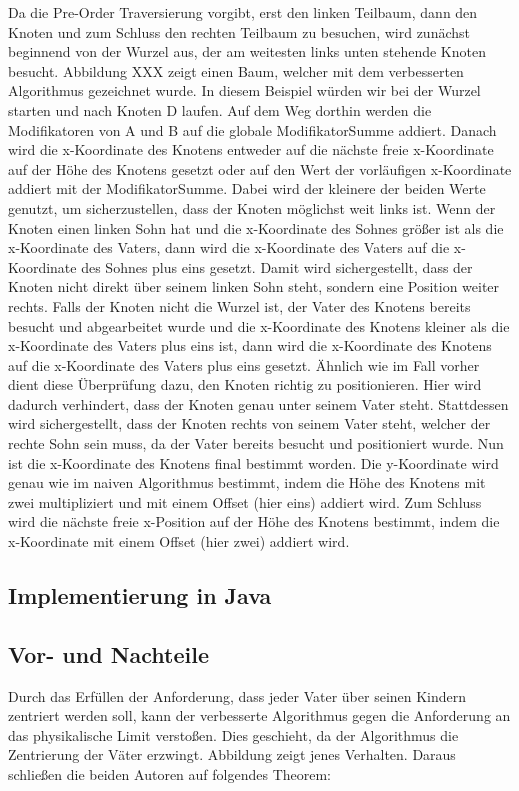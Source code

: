 Da die Pre-Order Traversierung vorgibt, erst den linken Teilbaum, dann den Knoten und zum Schluss den rechten Teilbaum zu besuchen,
wird zunächst beginnend von der Wurzel aus, der am weitesten links unten stehende Knoten besucht. Abbildung XXX zeigt einen Baum,
welcher mit dem verbesserten Algorithmus gezeichnet wurde. In diesem Beispiel würden wir bei der Wurzel starten und nach Knoten D laufen.
Auf dem Weg dorthin werden die Modifikatoren von A und B auf die globale ModifikatorSumme addiert.
Danach wird die x-Koordinate des Knotens entweder auf die nächste freie x-Koordinate auf der Höhe des Knotens gesetzt oder auf den
Wert der vorläufigen x-Koordinate addiert mit der ModifikatorSumme. Dabei wird der kleinere der beiden Werte genutzt, um sicherzustellen,
dass der Knoten möglichst weit links ist. Wenn der Knoten einen linken Sohn hat und die x-Koordinate des Sohnes größer ist als
die x-Koordinate des Vaters, dann wird die x-Koordinate des Vaters auf die x-Koordinate des Sohnes plus eins gesetzt. 
Damit wird sichergestellt, dass der Knoten nicht direkt über seinem linken Sohn steht, sondern eine Position weiter rechts.
Falls der Knoten nicht die Wurzel ist, der Vater des Knotens bereits besucht und abgearbeitet wurde und die x-Koordinate des Knotens
kleiner als die x-Koordinate des Vaters plus eins ist, dann wird die x-Koordinate des Knotens auf die x-Koordinate des Vaters plus eins gesetzt.
Ähnlich wie im Fall vorher dient diese Überprüfung dazu, den Knoten richtig zu positionieren. Hier wird dadurch verhindert,
dass der Knoten genau unter seinem Vater steht. Stattdessen wird sichergestellt, dass der Knoten rechts von seinem Vater steht,
welcher der rechte Sohn sein muss, da der Vater bereits besucht und positioniert wurde. Nun ist die x-Koordinate des Knotens final
bestimmt worden. Die y-Koordinate wird genau wie im naiven Algorithmus bestimmt, indem die Höhe des Knotens mit zwei multipliziert
und mit einem Offset (hier eins) addiert wird. Zum Schluss wird die nächste freie x-Position auf der Höhe des Knotens bestimmt,
indem die x-Koordinate mit einem Offset (hier zwei) addiert wird. 


\subsection{Implementierung in Java}

\subsection{Vor- und Nachteile}
Durch das Erfüllen der Anforderung, dass jeder Vater über seinen Kindern zentriert werden soll, kann der verbesserte Algorithmus gegen
die Anforderung an das physikalische Limit verstoßen. Dies geschieht, da der Algorithmus die Zentrierung der Väter erzwingt.
Abbildung  zeigt jenes Verhalten. Daraus schließen die beiden Autoren auf folgendes Theorem:

